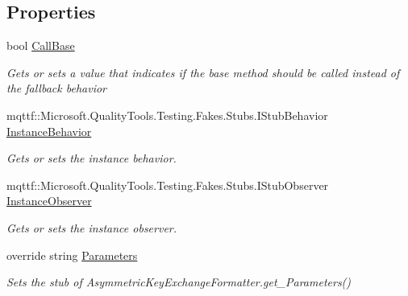 \subsection*{Properties}
\begin{DoxyCompactItemize}
\item 
bool \hyperlink{class_system_1_1_security_1_1_cryptography_1_1_fakes_1_1_stub_asymmetric_key_exchange_formatter_a7f7f0e9aa2c108fb02a604909c6c5da1}{Call\-Base}
\begin{DoxyCompactList}\small\item\em Gets or sets a value that indicates if the base method should be called instead of the fallback behavior\end{DoxyCompactList}\item 
mqttf\-::\-Microsoft.\-Quality\-Tools.\-Testing.\-Fakes.\-Stubs.\-I\-Stub\-Behavior \hyperlink{class_system_1_1_security_1_1_cryptography_1_1_fakes_1_1_stub_asymmetric_key_exchange_formatter_a829490daf7ad429b1b6d8f4fa9197da2}{Instance\-Behavior}
\begin{DoxyCompactList}\small\item\em Gets or sets the instance behavior.\end{DoxyCompactList}\item 
mqttf\-::\-Microsoft.\-Quality\-Tools.\-Testing.\-Fakes.\-Stubs.\-I\-Stub\-Observer \hyperlink{class_system_1_1_security_1_1_cryptography_1_1_fakes_1_1_stub_asymmetric_key_exchange_formatter_af570116d1be70392313ea15a865b7542}{Instance\-Observer}
\begin{DoxyCompactList}\small\item\em Gets or sets the instance observer.\end{DoxyCompactList}\item 
override string \hyperlink{class_system_1_1_security_1_1_cryptography_1_1_fakes_1_1_stub_asymmetric_key_exchange_formatter_a0b9ba9e4226fd319cbdad8a4788225a2}{Parameters}
\begin{DoxyCompactList}\small\item\em Sets the stub of Asymmetric\-Key\-Exchange\-Formatter.\-get\-\_\-\-Parameters()\end{DoxyCompactList}\end{DoxyCompactItemize}


